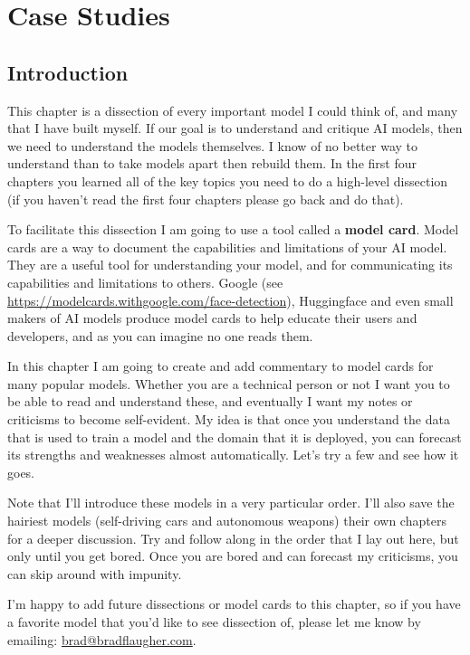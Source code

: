 \setchapterpreamble[u]{\margintoc}
\chapter{Case Studies}


\section{Introduction}

This chapter is a dissection of every important model I could think of, and many that I have built myself. If our goal is to understand and critique AI models, then we need to understand the models themselves. I know of no better way to understand than to take models apart then rebuild them. In the first four chapters you learned all of the key topics you need to do a high-level dissection (if you haven't read the first four chapters please go back and do that). 

To facilitate this dissection I am going to use a tool called a \textbf{model card}. Model cards are a way to document the capabilities and limitations of your AI model. They are a useful tool for understanding your model, and for communicating its capabilities and limitations to others. Google (see \url{https://modelcards.withgoogle.com/face-detection}), Huggingface and even small makers of AI models produce model cards to help educate their users and developers, and as you can imagine no one reads them. 

In this chapter I am going to create and add commentary to model cards for many popular models. Whether you are a technical person or not I want you to be able to read and understand these, and eventually I want my notes or criticisms to become self-evident. My idea is that once you understand the data that is used to train a model and the domain that it is deployed, you can forecast its strengths and weaknesses almost automatically. Let's try a few and see how it goes.

Note that I'll introduce these models in a very particular order. I'll also save the hairiest models (self-driving cars and autonomous weapons) their own chapters for a deeper discussion. Try and follow along in the order that I lay out here, but only until you get bored. Once you are bored and can forecast my criticisms, you can skip around with impunity.

I'm happy to add future dissections or model cards to this chapter, so if you have a favorite model that you'd like to see dissection of, please let me know by emailing: \href{mailto:brad@bradflaugher.com}{brad@bradflaugher.com}.

